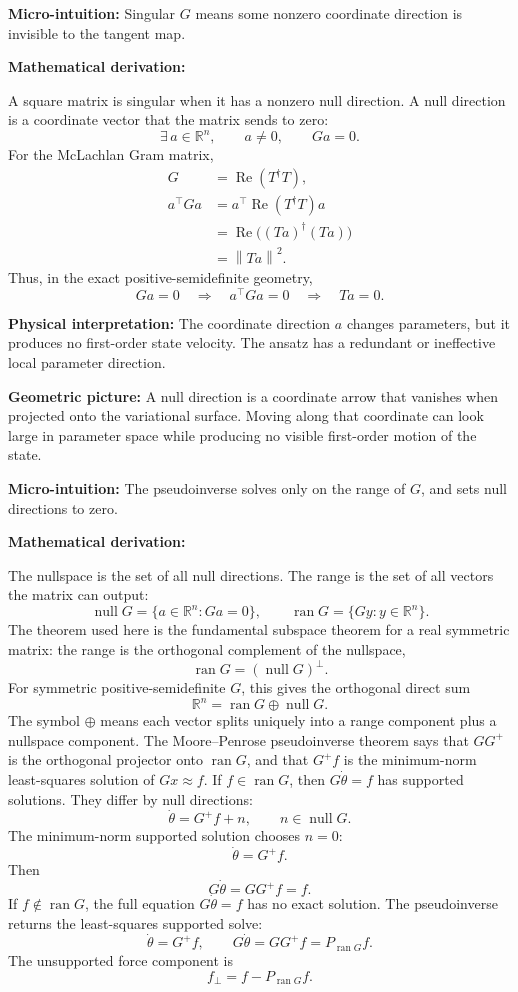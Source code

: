 \documentclass[10pt,twocolumn]{article}
\newcommand{\norm}[1]{\left\lVert #1\right\rVert}
\newcommand{\R}{\mathbb R}
\newcommand{\Real}{\operatorname{Re}}
\newcommand{\micro}[1]{%
  \par\smallskip
  \noindent\textcolor{deepblue}{\textbf{Micro-intuition:}} #1
  \par\smallskip}
\newcommand{\deriv}{%
  \par\noindent\textcolor{deepviolet}{\textbf{Mathematical derivation:}}\par\vspace{-1mm}}
\newcommand{\phys}[1]{%
  \par\smallskip
  \noindent\textcolor{deepgreen}{\textbf{Physical interpretation:}} #1
  \par\smallskip}
\newcommand{\geom}[1]{%
  \par\smallskip
  \noindent\textcolor{deepviolet}{\textbf{Geometric picture:}} #1
  \par\smallskip}
\begin{document}
\micro{Singular \(G\) means some nonzero coordinate direction is invisible to
the tangent map.}

\deriv
A square matrix is singular when it has a nonzero null direction. A null
direction is a coordinate vector that the matrix sends to zero:
\[
\exists\,a\in\R^n,\qquad a\ne0,\qquad Ga=0.
\]
For the McLachlan Gram matrix,
\[
\begin{aligned}
G&=\Real(T^\dagger T),\\
a^\top Ga
&=a^\top\Real(T^\dagger T)a\\
&=\Real\bigl((Ta)^\dagger(Ta)\bigr)\\
&=\norm{Ta}^2.
\end{aligned}
\]
Thus, in the exact positive-semidefinite geometry,
\[
Ga=0
\quad\Longrightarrow\quad
a^\top Ga=0
\quad\Longrightarrow\quad
Ta=0.
\]

\phys{The coordinate direction \(a\) changes parameters, but it produces no
first-order state velocity. The ansatz has a redundant or ineffective local
parameter direction.}

\geom{A null direction is a coordinate arrow that vanishes when projected onto
the variational surface. Moving along that coordinate can look large in
parameter space while producing no visible first-order motion of the state.}

\micro{The pseudoinverse solves only on the range of \(G\), and sets null
directions to zero.}

\deriv
The nullspace is the set of all null directions. The range is the set of all
vectors the matrix can output:
\[
\operatorname{null}G=\{a\in\R^n:Ga=0\},
\qquad
\operatorname{ran}G=\{Gy:y\in\R^n\}.
\]
The theorem used here is the fundamental subspace theorem for a real symmetric
matrix: the range is the orthogonal complement of the nullspace,
\[
\operatorname{ran}G=(\operatorname{null}G)^\perp.
\]
For symmetric positive-semidefinite \(G\), this gives the orthogonal direct
sum
\[
\R^n=\operatorname{ran}G\oplus\operatorname{null}G.
\]
The symbol \(\oplus\) means each vector splits uniquely into a range component
plus a nullspace component.
The Moore--Penrose pseudoinverse theorem says that \(GG^+\) is the orthogonal
projector onto \(\operatorname{ran}G\), and that \(G^+f\) is the
minimum-norm least-squares solution of \(Gx\approx f\).
If \(f\in\operatorname{ran}G\), then \(G\dot\theta=f\) has supported solutions.
They differ by null directions:
\[
\dot\theta=G^+f+n,
\qquad
n\in\operatorname{null}G.
\]
The minimum-norm supported solution chooses \(n=0\):
\[
\dot\theta=G^+f.
\]
Then
\[
G\dot\theta=GG^+f=f.
\]
If \(f\notin\operatorname{ran}G\), the full equation \(G\dot\theta=f\) has no
exact solution. The pseudoinverse returns the least-squares supported solve:
\[
\dot\theta=G^+f,
\qquad
G\dot\theta=GG^+f=P_{\operatorname{ran}G}f.
\]
The unsupported force component is
\[
f_\perp=f-P_{\operatorname{ran}G}f.
\]
\end{document}
